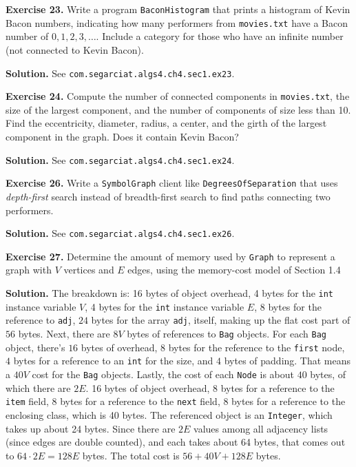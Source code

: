 \documentclass[12pt, a4paper]{article}
\newenvironment{ex}[2][Exercise]
{\par\medskip\noindent \textbf{#1 #2.}}
{\medskip}
\newenvironment{sol}[1][Solution]
{\par\medskip\noindent \textbf{#1.} }
{\medskip}
\begin{document}
	\begin{ex}{23}
		Write a program \texttt{BaconHistogram} that prints a histogram of Kevin Bacon numbers,
		indicating how many performers from \texttt{movies.txt} have a Bacon number of $0,
		1, 2, 3,\ldots$. Include a category for those who have an infinite number (not connected
		to Kevin Bacon).
	\end{ex}
	\begin{sol}
		See \texttt{com.segarciat.algs4.ch4.sec1.ex23}.
	\end{sol}
	\begin{ex}{24}
		Compute the number of connected components in \texttt{movies.txt}, the size of the
		largest component, and the number of components of size less than 10. Find
		the eccentricity, diameter, radius, a center, and the girth of the largest
		component in the graph. Does it contain Kevin Bacon?
	\end{ex}
	\begin{sol}
		See \texttt{com.segarciat.algs4.ch4.sec1.ex24}.
	\end{sol}
	\begin{ex}{26}
		Write a \texttt{SymbolGraph} client like \texttt{DegreesOfSeparation} that uses \emph{depth-first} search instead of breadth-first search to find paths connecting
		two performers.
	\end{ex}
	\begin{sol}
		See \texttt{com.segarciat.algs4.ch4.sec1.ex26}.
	\end{sol}
	\begin{ex}{27}
		Determine the amount of memory used by \texttt{Graph} to represent a graph with
		$V$ vertices and $E$ edges, using the memory-cost model of Section 1.4
	\end{ex}
	\begin{sol}
		The breakdown is: 16 bytes of object overhead, 4 bytes for the \texttt{int}
		instance variable $V$, 4 bytes for the \texttt{int} instance variable $E$,
		$8$ bytes for the reference to \texttt{adj}, $24$ bytes for the array \texttt{adj},
		itself, making up the flat cost part of $56$ bytes. Next, there are $8V$ bytes of
		references to \texttt{Bag} objects. For each \texttt{Bag} object, there's $16$ bytes
		of overhead, $8$ bytes for the reference to the \texttt{first} node, $4$ bytes
		for a reference to an \texttt{int} for the size, and $4$ bytes of padding.
		That means a $40V$ cost for the \texttt{Bag} objects. Lastly, the cost of each
		\texttt{Node} is about $40$ bytes, of which there are $2E$.
		16 bytes of object overhead, 8 bytes for a reference to the \texttt{item}
		field, 8 bytes for a reference to the \texttt{next} field, 8 bytes for a reference
		to the enclosing class, which is 40 bytes. The referenced object is an \texttt{Integer}, which
		takes up about 24 bytes. Since there are $2E$ values among all adjacency lists
		(since edges are double counted), and each takes about 64 bytes, that comes out to
		$64\cdot 2E=128E$ bytes. The total cost is $56 + 40V + 128E$ bytes.
	\end{sol}
\end{document}

